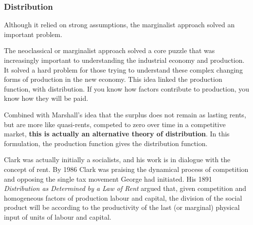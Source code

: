 \subsubsection{Distribution}
Although it relied on strong assumptions, the marginalist approach solved an important problem.

The neoclassical or \gls{marginalist} approach %
solved a core puzzle that was increasingly important to understanding the industrial economy and production. It solved a hard problem for those trying to understand these complex changing forms of production in the new economy. This idea linked the production function, with distribution. If you know how factors contribute to production, you know how they will be paid. 

Combined with Marshall's idea that the surplus does not remain as lasting rents, but are more like quasi-rents, competed to zero over time in a competitive market, 
\textbf{this is actually an alternative theory of distribution}. %
In this formulation, the production function gives the distribution function.


Clark was actually initially a socialists, and his 
work is in dialogue with the concept of rent. 
By 1986 Clark was praising the dynamical process of competition and opposing the \gls{single tax} movement George had initiated.  His 1891 \textit{Distribution as Determined by a Law of Rent} \cite{clarkDistributionDeterminedLaw1891} argued that, given competition and homogeneous factors of production labour and capital, the division of the social product will be according to the productivity of the last (or marginal) physical input of units of labour and capital.

